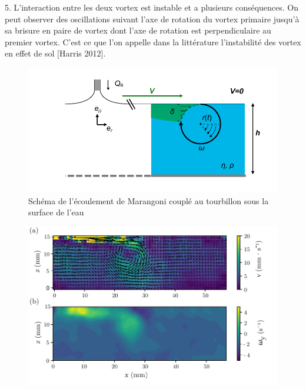 \documentclass[french, 10pt]{article}
\begin{document}
5. L'interaction entre les deux vortex est instable et a plusieurs conséquences. On peut observer des oscillations suivant l'axe de rotation du vortex primaire jusqu'à sa brisure en paire de vortex dont l'axe de rotation est perpendiculaire au premier vortex. C'est ce que l'on appelle dans la littérature l'instabilité des vortex en effet de sol [Harris 2012].%

\begin{figure}
  \centering
  \includegraphics[width=.5\linewidth]{Schema_enroulement_v2.pdf}
  \caption{Schéma de l'écoulement de Marangoni couplé au tourbillon sous la surface de l'eau}
\end{figure}

\begin{figure}[!ht]
\noindent\begin{minipage}[c]{0.48\linewidth}
  \resizebox{1\textwidth}{!}{}
  \label{fig:ZprojectImageJ}
\end{minipage}\hfill
\begin{minipage}[c]{0.48\linewidth}
  \centering
  \includegraphics[width=.9\linewidth]{./figures/rolling_vortex_velocity_vorticity_v2.pdf}
  \label{fig:PIV}
\end{minipage}\medskip
\end{figure}
\end{document}
